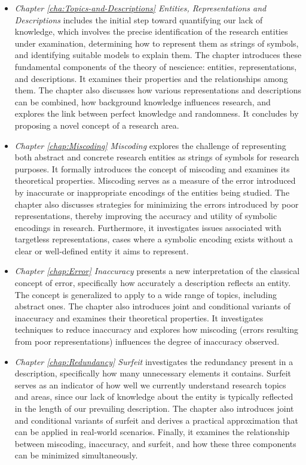 \begin{itemize}

 \item \emph{Chapter \ref{cha:Topics-and-Descriptions} Entities, Representations and Descriptions} includes the initial step toward quantifying our lack of knowledge, which involves the precise identification of the research entities under examination, determining how to represent them as strings of symbols, and identifying suitable models to explain them. The chapter introduces these fundamental components of the theory of nescience: entities, representations, and descriptions. It examines their properties and the relationships among them. The chapter also discusses how various representations and descriptions can be combined, how background knowledge influences research, and explores the link between perfect knowledge and randomness. It concludes by proposing a novel concept of a research area.

\item \emph{Chapter \ref{chap:Miscoding} Miscoding} explores the challenge of representing both abstract and concrete research entities as strings of symbols for research purposes. It formally introduces the concept of miscoding and examines its theoretical properties. Miscoding serves as a measure of the error introduced by inaccurate or inappropriate encodings of the entities being studied. The chapter also discusses strategies for minimizing the errors introduced by poor representations, thereby improving the accuracy and utility of symbolic encodings in research.  Furthermore, it investigates issues associated with targetless representations, cases where a symbolic encoding exists without a clear or well-defined entity it aims to represent.

\item \emph{Chapter \ref{chap:Error} Inaccuracy} presents a new interpretation of the classical concept of error, specifically how accurately a description reflects an entity. The concept is generalized to apply to a wide range of topics, including abstract ones. The chapter also introduces joint and conditional variants of inaccuracy and examines their theoretical properties. It investigates techniques to reduce inaccuracy and explores how miscoding (errors resulting from poor representations) influences the degree of inaccuracy observed.

\item \emph{Chapter \ref{chap:Redundancy} Surfeit} investigates the redundancy present in a description, specifically how many unnecessary elements it contains. Surfeit serves as an indicator of how well we currently understand research topics and areas, since our lack of knowledge about the entity is typically reflected in the length of our prevailing description. The chapter also introduces joint and conditional variants of surfeit and derives a practical approximation that can be applied in real-world scenarios. Finally, it examines the relationship between miscoding, inaccuracy, and surfeit, and how these three components can be minimized simultaneously.


\end{itemize}
